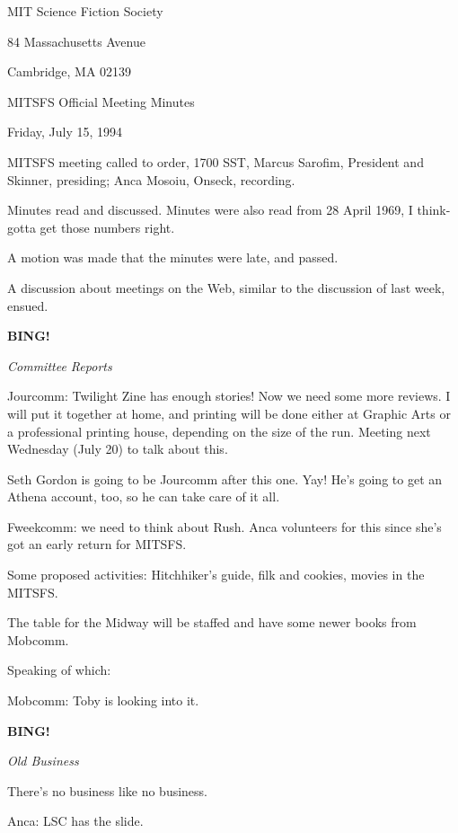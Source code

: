 \documentclass[12pt]{article}
\newcommand{\bing}{{\bf BING!} }
\newcommand{\goto}[1]{\bing \vskip 12pt \centerline{{\em{#1}}}}
\begin{document}
\begin{center}

MIT Science Fiction Society 

84 Massachusetts Avenue

Cambridge, MA 02139

\vspace{12pt}

MITSFS Official Meeting Minutes 

Friday, July 15, 1994

\end{center}
 
\vspace{18pt}

\setlength{\parskip}{6pt}

\noindent
MITSFS meeting called to order, 1700 SST,
Marcus Sarofim, President and Skinner, presiding; Anca Mosoiu, Onseck, recording.

Minutes read and discussed. Minutes were also read from 28 April 1969, I think- gotta get those numbers right.

A motion was made that the minutes were late, and passed.

A discussion about meetings on the Web, similar to the discussion of last week, ensued.

\goto{Committee Reports}

Jourcomm: Twilight Zine has enough stories! Now we need some more reviews. I will put it together at home, and printing will be done either at Graphic Arts or a professional printing house, depending on the size of the run. Meeting next Wednesday (July 20) to talk about this.

Seth Gordon is going to be Jourcomm after this one. Yay! He's going to get an Athena account, too, so he can take care of it all.

Fweekcomm: we need to think about Rush. Anca volunteers for this since she's got an early return for MITSFS.

Some proposed activities: Hitchhiker's guide, filk and cookies, movies in the MITSFS.

The table for the Midway will be staffed and have some newer books from Mobcomm.

Speaking of which:

Mobcomm: Toby is looking into it.

\goto{Old Business}

There's no business like no business.

Anca: LSC has the slide.
\end{document}
